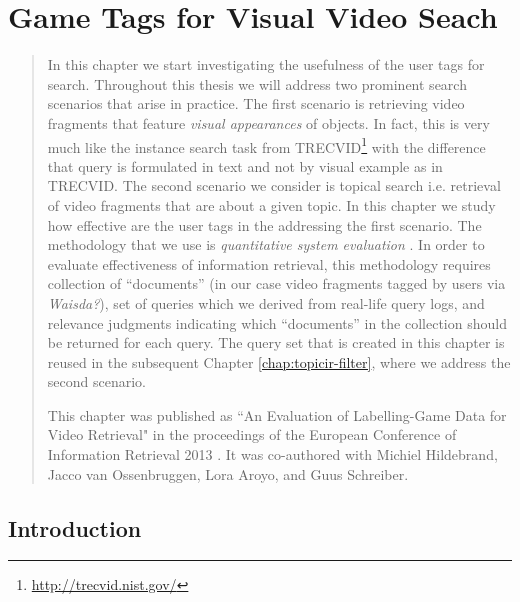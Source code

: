 \chapter{Game Tags for Visual Video Seach}\label{chap:ecir}

\begin{quotation}
\noindent
In this chapter we start investigating the usefulness of the user tags for search. Throughout this thesis we will address two prominent search scenarios that arise in practice. The first scenario is retrieving video fragments that feature \textit{visual appearances} of objects. In fact, this is very much like the instance search task from TRECVID\footnote{\url{http://trecvid.nist.gov/}} with the difference that query is formulated in text and not by visual example as in TRECVID. The second scenario we consider is topical search i.e. retrieval of video fragments that are about a given topic. In this chapter we study how effective are the user tags in the addressing the first scenario. The methodology that we use is \textit{quantitative system evaluation} \cite{vorhees}. In order to evaluate effectiveness of information retrieval, this methodology requires collection of ``documents'' (in our case video fragments tagged by users via \textit{Waisda?}), set of queries which we derived from real-life query logs, and relevance judgments  indicating which ``documents'' in the collection should be returned for each query. The query set that is created in this chapter is reused in the subsequent Chapter \ref{chap:topicir-filter}, where we address the second scenario.

This chapter was published as ``An Evaluation of Labelling-Game Data for Video Retrieval" in the proceedings of the European Conference of Information Retrieval 2013 \cite{ecir}. It was co-authored with Michiel Hildebrand, Jacco van Ossenbruggen, Lora Aroyo, and Guus Schreiber.
\end{quotation}

\section{Introduction}\label{sec:intro}

